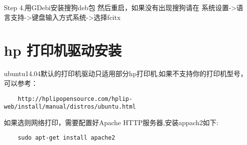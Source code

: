 \documentclass[UTF8]{ctexart}
\numberwithin{equation}{section}
\numberwithin{figure}{section}
\numberwithin{table}{section}
\begin{document}
\noindent\large{Step 4.用GDebi安装搜狗deb包}
{\color{Brown}{\begin{verbatim}
    sudo gdebi sogou_pinyin_linux_1.1.0.0037_amd64.deb
\end{verbatim}}}
\normalsize{然后重启，如果没有出现搜狗请在
系统设置->语言支持->键盘输入方式系统->选择fcitx}

\noindent\LARGE{\section{\color{blue}hp 打印机驱动安装}}
\normalsize ubuntu14.04默认的打印机驱动只适用部分hp打印机,如果不支持你的打印机型号，可以参考：
\normalsize{\color{blue}\begin{verbatim}
    http://hplipopensource.com/hplip-web/install/manual/distros/ubuntu.html
\end{verbatim}}
如果选则网络打印，需要配置好Apache HTTP服务器,安装appach2如下:
\normalsize{\color{blue}\begin{verbatim}
    sudo apt-get install apache2
\end{verbatim}}
\end{document}
